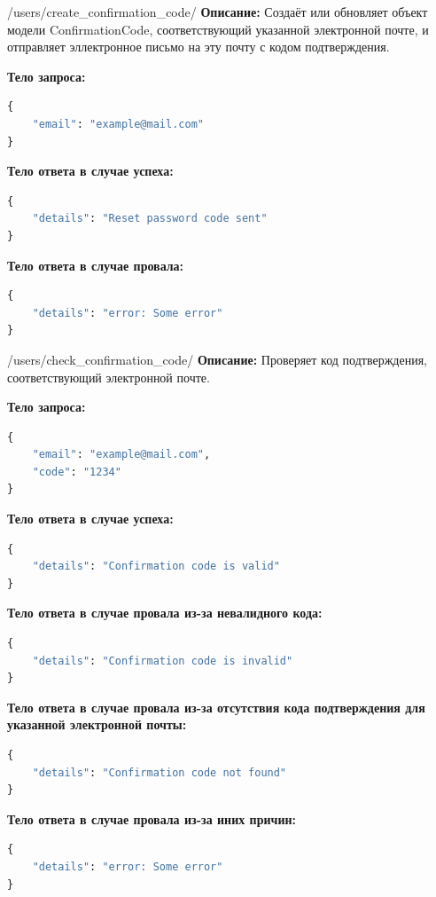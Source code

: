 \documentclass[a4paper,14pt]{extarticle}
\begin{document}
	\begin{postapi}{/users/create\_confirmation\_code/}
		\textbf{Описание:} Создаёт или обновляет объект модели ConfirmationCode, соответствующий указанной электронной почте, и отправляет эллектронное письмо на эту почту с кодом подтверждения.\medskip
		
		\textbf{Тело запроса:}
		\begin{lstlisting}[language=Python]
{
    "email": "example@mail.com"
}
		\end{lstlisting}
		
		\textbf{Тело ответа в случае успеха:}
		\begin{lstlisting}[language=Python]
{
    "details": "Reset password code sent"
}
		\end{lstlisting}
		
		\textbf{Тело ответа в случае провала:}
		\begin{lstlisting}[language=Python]
{
    "details": "error: Some error"
}
		\end{lstlisting}
	\end{postapi}
	
	\begin{postapi}{/users/check\_confirmation\_code/}
		\textbf{Описание:} Проверяет код подтверждения, соответствующий электронной почте.\medskip
		
		\textbf{Тело запроса:}
		\begin{lstlisting}[language=Python]
{
    "email": "example@mail.com",
    "code": "1234"
}
		\end{lstlisting}
		
		\textbf{Тело ответа в случае успеха:}
		\begin{lstlisting}[language=Python]
{
    "details": "Confirmation code is valid"
}
		\end{lstlisting}
		
		\textbf{Тело ответа в случае провала из-за невалидного кода:}
		\begin{lstlisting}[language=Python]
{
    "details": "Confirmation code is invalid"
}
		\end{lstlisting}
		
		\textbf{Тело ответа в случае провала из-за отсутствия кода подтверждения для указанной электронной почты:}
		\begin{lstlisting}[language=Python]
{
    "details": "Confirmation code not found"
}
		\end{lstlisting}
		
		\textbf{Тело ответа в случае провала из-за иних причин:}
		\begin{lstlisting}[language=Python]
{
    "details": "error: Some error"
}
		\end{lstlisting}
	\end{postapi}
	
\end{document}
